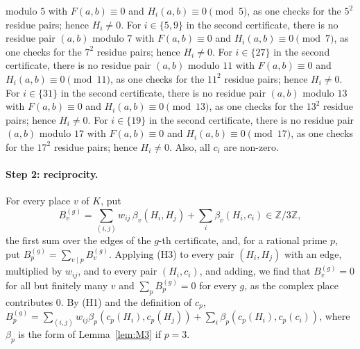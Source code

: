 \documentclass[11pt]{article}
\newcommand{\Z}{\mathbb{Z}}
\begin{document}
modulo $5$ with $F(a,b)\equiv0$ and $H_i(a,b)\equiv0\pmod{5}$, as one checks for the $5^2$ residue pairs; hence $H_i\neq0$. For $i\in\{5,\allowbreak 9\}$ in the second certificate, there is no residue pair $(a,b)$ modulo $7$ with $F(a,b)\equiv0$ and $H_i(a,b)\equiv0\pmod{7}$, as one checks for the $7^2$ residue pairs; hence $H_i\neq0$. For $i\in\{27\}$ in the second certificate, there is no residue pair $(a,b)$ modulo $11$ with $F(a,b)\equiv0$ and $H_i(a,b)\equiv0\pmod{11}$, as one checks for the $11^2$ residue pairs; hence $H_i\neq0$. For $i\in\{31\}$ in the second certificate, there is no residue pair $(a,b)$ modulo $13$ with $F(a,b)\equiv0$ and $H_i(a,b)\equiv0\pmod{13}$, as one checks for the $13^2$ residue pairs; hence $H_i\neq0$. For $i\in\{19\}$ in the second certificate, there is no residue pair $(a,b)$ modulo $17$ with $F(a,b)\equiv0$ and $H_i(a,b)\equiv0\pmod{17}$, as one checks for the $17^2$ residue pairs; hence $H_i\neq0$. Also, all $c_i$ are non-zero.

\paragraph{Step 2: reciprocity.} For every place $v$ of $K$, put
\begin{equation}\label{eq:B}
B^{(g)}_v=\sum_{(i,j)}w_{ij}\,\beta_v(H_i,H_j)+\sum_i\beta_v(H_i,c_i)\in\Z/3\Z,
\end{equation}
the first sum over the edges of the $g$-th certificate, and, for a rational prime $p$, put $B^{(g)}_p=\sum_{v\mid p}B^{(g)}_v$. Applying (H3) to every pair $(H_i,H_j)$ with an edge, multiplied by $w_{ij}$, and to every pair $(H_i,c_i)$, and adding, we find that $B^{(g)}_v=0$ for all but finitely many $v$ and $\sum_pB^{(g)}_p=0$ for every $g$, as the complex place contributes $0$. By (H1) and the definition of $c_p$, $B^{(g)}_p=\sum_{(i,j)}w_{ij}\beta_p(c_p(H_i),c_p(H_j))+\sum_i\beta_p(c_p(H_i),c_p(c_i))$, where $\beta_p$ is the form of Lemma~\ref{lem:M3} if $p=3$.
\end{document}
